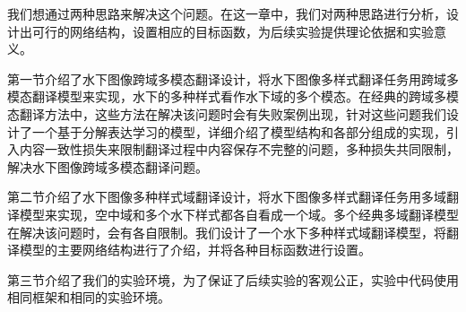 我们想通过两种思路来解决这个问题。在这一章中，我们对两种思路进行分析，设计出可行的网络结构，设置相应的目标函数，为后续实验提供理论依据和实验意义。

第一节介绍了水下图像跨域多模态翻译设计，将水下图像多样式翻译任务用跨域多模态翻译模型来实现，水下的多种样式看作水下域的多个模态。在经典的跨域多模态翻译方法中，这些方法在解决该问题时会有失败案例出现，针对这些问题我们设计了一个基于分解表达学习的模型，详细介绍了模型结构和各部分组成的实现，引入内容一致性损失来限制翻译过程中内容保存不完整的问题，多种损失共同限制，解决水下图像跨域多模态翻译问题。

第二节介绍了水下图像多种样式域翻译设计，将水下图像多样式翻译任务用多域翻译模型来实现，空中域和多个水下样式都各自看成一个域。多个经典多域翻译模型在解决该问题时，会有各自限制。我们设计了一个水下多种样式域翻译模型，将翻译模型的主要网络结构进行了介绍，并将各种目标函数进行设置。

第三节介绍了我们的实验环境，为了保证了后续实验的客观公正，实验中代码使用相同框架和相同的实验环境。
